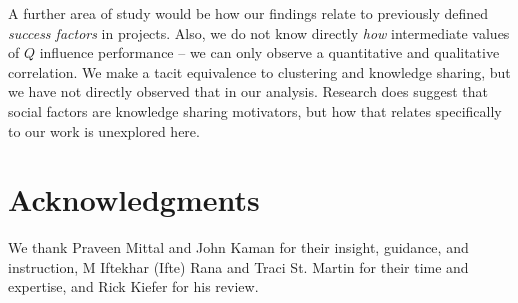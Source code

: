 \documentclass{proc}
\begin{document}
A further area of study would be how our findings relate to previously defined \textit{success factors} in projects\cite{cooke2002real}. Also, we do not know directly \textit{how} intermediate values of $Q$ influence performance -- we can only observe a quantitative and qualitative correlation. We make a tacit equivalence to clustering and knowledge sharing, but we have not directly observed that in our analysis. Research does suggest that social factors are knowledge sharing motivators\cite{hendriks1999share}, but how that relates specifically to our work is unexplored here.\\

\section{Acknowledgments}
We thank Praveen Mittal and John Kaman for their insight, guidance, and instruction, M Iftekhar (Ifte) Rana and Traci St. Martin for their time and expertise, and Rick Kiefer for his review.






\end{document}
